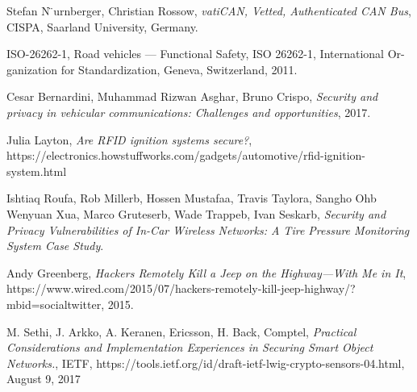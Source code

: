 \documentclass[11pt]{article}
\begin{document}
\begin{thebibliography}{10}
    Stefan N ̈urnberger, Christian Rossow,
    \textit{vatiCAN, Vetted, Authenticated CAN Bus},
	CISPA, Saarland University, Germany.
	
	ISO-26262-1, Road vehicles — Functional Safety, ISO 26262-1, International Or- ganization for Standardization, Geneva, Switzerland, 2011.
	
	Cesar Bernardini, Muhammad Rizwan Asghar, Bruno Crispo,
	\textit{Security and privacy in vehicular communications: Challenges and opportunities}, 2017.
	
	Julia Layton, \textit{Are RFID ignition systems secure?}, https://electronics.howstuffworks.com/gadgets/automotive/rfid-ignition-system.html
	
	Ishtiaq Roufa, Rob Millerb, Hossen Mustafaa, Travis Taylora, Sangho Ohb
	Wenyuan Xua, Marco Gruteserb, Wade Trappeb, Ivan Seskarb, \textit{Security and Privacy Vulnerabilities of In-Car Wireless Networks: A Tire Pressure Monitoring System Case Study}.
	
	Andy Greenberg, \textit{Hackers Remotely Kill a Jeep on the Highway—With Me in It}, https://www.wired.com/2015/07/hackers-remotely-kill-jeep-highway/?mbid=social\textunderscore twitter, 2015.
	
	M. Sethi, J. Arkko, A. Keranen, Ericsson, H. Back, Comptel, 
	\textit{Practical Considerations and Implementation Experiences in Securing Smart Object Networks.},
	IETF, https://tools.ietf.org/id/draft-ietf-lwig-crypto-sensors-04.html, 
	August 9, 2017

	
\end{thebibliography}
\end{document}

